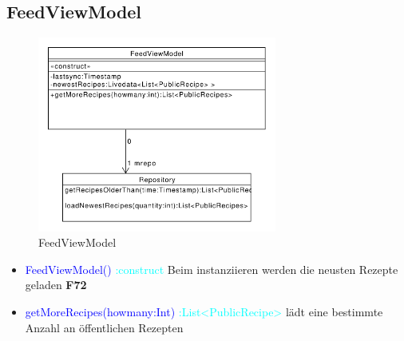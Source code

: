 \subsection{FeedViewModel}
\begin{figure}[H]
	\centering
	\includegraphics[width=0.7\textwidth]{pics/viewModel/Feed_ViewModel.pdf}%
	\caption{FeedViewModel}%
	\label{viewModel}%
\end{figure}
\begin{itemize}
	\item \textcolor{blue}{FeedViewModel()}
	\textcolor{cyan}{:construct} Beim instanziieren werden die neusten Rezepte geladen \textbf{F72}
	
	\item \textcolor{blue}{getMoreRecipes(howmany:Int)}
	\textcolor{cyan}{:List<PublicRecipe>} lädt eine bestimmte Anzahl an öffentlichen Rezepten
\end{itemize}


